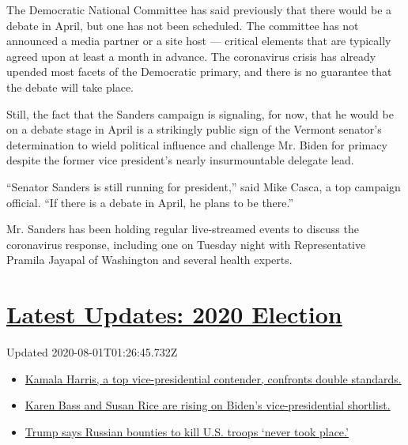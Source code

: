 The Democratic National Committee has said previously that there would
be a debate in April, but one has not been scheduled. The committee has
not announced a media partner or a site host --- critical elements that
are typically agreed upon at least a month in advance. The coronavirus
crisis has already upended most facets of the Democratic primary, and
there is no guarantee that the debate will take place.

Still, the fact that the Sanders campaign is signaling, for now, that he
would be on a debate stage in April is a strikingly public sign of the
Vermont senator's determination to wield political influence and
challenge Mr. Biden for primacy despite the former vice president's
nearly insurmountable delegate lead.

``Senator Sanders is still running for president,'' said Mike Casca, a
top campaign official. ``If there is a debate in April, he plans to be
there.''

Mr. Sanders has been holding regular live-streamed events to discuss the
coronavirus response, including one on Tuesday night with Representative
Pramila Jayapal of Washington and several health experts.

\hypertarget{latest-updates-2020-election}{%
\section{\texorpdfstring{\href{https://www.nytimes.com/2020/07/31/us/elections/biden-vs-trump.html?action=click\&pgtype=Article\&state=default\&region=MAIN_CONTENT_1\&context=storylines_live_updates}{Latest
Updates: 2020
Election}}{Latest Updates: 2020 Election}}\label{latest-updates-2020-election}}

Updated 2020-08-01T01:26:45.732Z

\begin{itemize}
\tightlist
\item
  \href{https://www.nytimes.com/2020/07/31/us/elections/biden-vs-trump.html?action=click\&pgtype=Article\&state=default\&region=MAIN_CONTENT_1\&context=storylines_live_updates\#link-29fdff45}{Kamala
  Harris, a top vice-presidential contender, confronts double
  standards.}
\item
  \href{https://www.nytimes.com/2020/07/31/us/elections/biden-vs-trump.html?action=click\&pgtype=Article\&state=default\&region=MAIN_CONTENT_1\&context=storylines_live_updates\#link-13ec3d9c}{Karen
  Bass and Susan Rice are rising on Biden's vice-presidential
  shortlist.}
\item
  \href{https://www.nytimes.com/2020/07/31/us/elections/biden-vs-trump.html?action=click\&pgtype=Article\&state=default\&region=MAIN_CONTENT_1\&context=storylines_live_updates\#link-49e9a016}{Trump
  says Russian bounties to kill U.S. troops `never took place.'}
\end{itemize}

